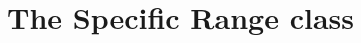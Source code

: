 \documentclass[a4paper,12pt,oneside]{book}
\begin{document}
\chapter{The Specific Range class}
\end{document}
